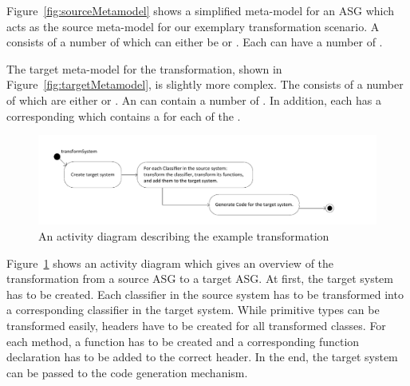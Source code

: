Figure~\ref{fig:sourceMetamodel} shows a simplified meta-model for an ASG which acts as the source meta-model for our exemplary transformation scenario. A  consists of a number of  which can either be  or . Each  can have a number of .

The target meta-model for the transformation, shown in Figure~\ref{fig:targetMetamodel}, is slightly more complex.
The  consists of a number of  which are either  or .
An  can contain a number of . In addition, each  has a corresponding  which contains a  for each  of the .


\begin{figure}[htbp]
\begin{center}
  \includegraphics[width=\textwidth]{figures/transformationOverview}
  \caption{An activity diagram describing the example transformation}
  \label{fig:transformationOverview}
\end{center}
\end{figure}

Figure~\ref{fig:transformationOverview} shows an activity diagram which gives an overview of the transformation from a source ASG to a target ASG.
At first, the target system has to be created. Each classifier in the source system has to be transformed into a corresponding classifier in the target system. While primitive types can be transformed easily, headers have to be created for all transformed classes. For each method, a function has to be created and a corresponding function declaration has to be added to the correct header. In the end, the target system can be passed to the code generation mechanism.